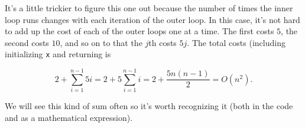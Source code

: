 It's a little trickier to figure this one out because the number of times the inner loop runs changes with each iteration of the outer loop.
In this case, it's not hard to add up the cost of each of the outer loops one at a time.
The first costs $5$, the second costs $10$, and so on to that the $j$th costs $5j$.
The total costs (including initializing \texttt{x} and returning is


\[
2 + \sum_{i=1}^{n-1}5i = 2 + 5\sum_{i=1}^{n-1}i = 2 + \frac{5n(n-1)}{2} = O(n^2).
\]


We will see this kind of sum often so it's worth recognizing it (both in the code and as a mathematical expression).
